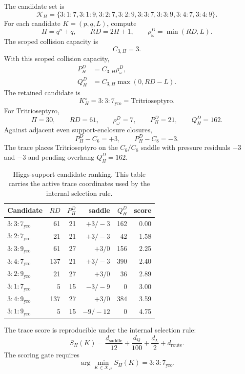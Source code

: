 The candidate set is
\[
\mathcal K_H=
\{3{:}1{:}7,3{:}1{:}9,3{:}2{:}7,3{:}2{:}9,
3{:}3{:}7,3{:}3{:}9,3{:}4{:}7,3{:}4{:}9\}.
\]
For each candidate \(K=(p,q,L)\), compute
\[
\Pi=q^p+q,
\qquad
RD=2\Pi+1,
\qquad
\rho^D_\omega=\min(RD,L).
\]
The scoped collision capacity is
\[
C_{3,H}=3.
\]
With this scoped collision capacity,
\[
\begin{aligned}
P^D_H&=C_{3,H}\rho^D_\omega,\\
Q^D_H&=C_{3,H}\max(0,RD-L).
\end{aligned}
\]
The retained candidate is
\[
K_H^\star=3{:}3{:}7_{\mathrm{yro}}=\mathrm{Tritrioseptyro}.
\]
For Tritrioseptyro,
\[
\Pi=30,
\qquad
RD=61,
\qquad
\rho^D_\omega=7,
\qquad
P^D_H=21,
\qquad
Q^D_H=162.
\]
Against adjacent even support-enclosure closures,
\[
P^D_H-C_6=+3,
\qquad
P^D_H-C_8=-3.
\]
The trace places Tritrioseptyro on the \(C_6/C_8\) saddle with pressure residuals \(+3\) and \(-3\) and pending overhang \(Q^D_H=162\).


\begin{table}[H]
\centering
\scriptsize
\caption{Higgs-support candidate ranking. This table carries the active trace coordinates used by the internal selection rule.}
\begin{tabular}{lrrrrr}
\toprule
Candidate & \(RD\) & \(P^D_H\) & saddle & \(Q^D_H\) & score \\
\midrule
\(3{:}3{:}7_{\mathrm{yro}}\) & 61 & 21 & \(+3/-3\) & 162 & 0.00 \\
\(3{:}2{:}7_{\mathrm{yro}}\) & 21 & 21 & \(+3/-3\) & 42 & 1.58 \\
\(3{:}3{:}9_{\mathrm{yro}}\) & 61 & 27 & \(+3/0\) & 156 & 2.25 \\
\(3{:}4{:}7_{\mathrm{yro}}\) & 137 & 21 & \(+3/-3\) & 390 & 2.40 \\
\(3{:}2{:}9_{\mathrm{yro}}\) & 21 & 27 & \(+3/0\) & 36 & 2.89 \\
\(3{:}1{:}7_{\mathrm{yro}}\) & 5 & 15 & \(-3/-9\) & 0 & 3.00 \\
\(3{:}4{:}9_{\mathrm{yro}}\) & 137 & 27 & \(+3/0\) & 384 & 3.59 \\
\(3{:}1{:}9_{\mathrm{yro}}\) & 5 & 15 & \(-9/-12\) & 0 & 4.75 \\
\bottomrule
\end{tabular}
\label{tab:manual-higgs-internal-candidates}
\end{table}


The trace score is reproducible under the internal selection rule:
\[
S_H(K)=\frac{d_{\mathrm{saddle}}}{12}+\frac{d_Q}{100}+\frac{d_L}{2}+d_{\mathrm{route}}.
\]
The scoring gate requires
\[
\arg\min_{K\in\mathcal K_H}S_H(K)=3{:}3{:}7_{\mathrm{yro}}.
\]

